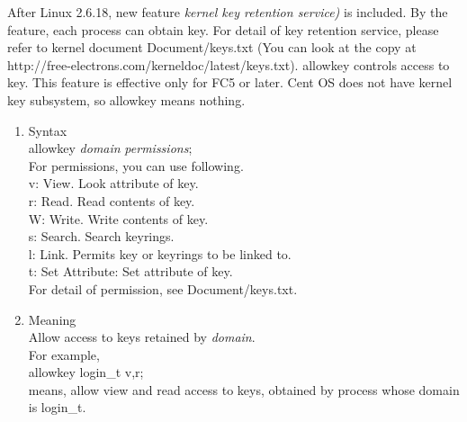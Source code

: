 \documentclass{article}
\begin{document}
After Linux 2.6.18, new feature {\it kernel key retention service)} is
included. By the feature, each process can obtain key. 
For detail of key retention service, please refer to kernel document
Document/keys.txt (You can look at the copy at
http://free-electrons.com/kerneldoc/latest/keys.txt).
allowkey controls access to key.
This feature is effective only for FC5 or later. Cent OS does not have
kernel key subsystem, so allowkey means nothing.\\

\begin{enumerate}
 \item Syntax\\
       allowkey {\it domain} {\it permissions};\\
For permissions, you can use following.\\
v: View. Look attribute of key.\\
r: Read. Read contents of key.\\
W: Write. Write contents of key. \\
s: Search. Search keyrings.\\
l: Link. Permits key  or keyrings to be linked to.\\
t: Set Attribute: Set attribute of key.\\
For detail of permission, see Document/keys.txt.       
 \item Meaning\\
 Allow access to keys retained by {\it  domain}.\\
For example,\\
allowkey login\_t v,r;\\
means, allow view and  read access to keys, obtained by process whose
       domain is login\_t.

\end{enumerate}
\end{document}
